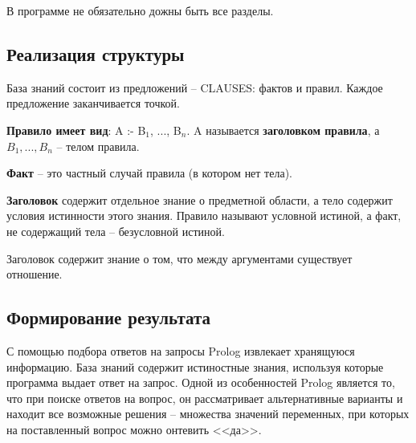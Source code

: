 В программе не обязательно дожны быть все разделы.

\subsection{Реализация структуры}

База знаний состоит из предложений -- CLAUSES: фактов и правил.
Каждое предложение заканчивается точкой.

\textbf{Правило имеет вид}: { \ttfamily A :- B$_1$, ..., B$_n$. } A называется \textbf{заголовком правила}, а $B_1, ..., B_n$ -- телом правила.

\textbf{Факт} -- это частный случай правила (в котором нет тела).

\textbf{Заголовок} содержит отдельное знание о предметной области, а тело содержит условия истинности этого знания. Правило называют условной истиной, а факт, не содержащий тела -- безусловной истиной.

Заголовок содержит знание о том, что между аргументами существует отношение.

\subsection{Формирование результата}

С помощью подбора ответов на запросы Prolog извлекает хранящуюся информацию. База знаний содержит истиностные знания, используя которые программа выдает ответ на запрос. Одной из особенностей Prolog является то, что при поиске ответов на вопрос, он рассматривает альтернативные варианты и находит все возможные решения -- множества значений переменных, при которых на поставленный вопрос можно онтевить <<да>>.
